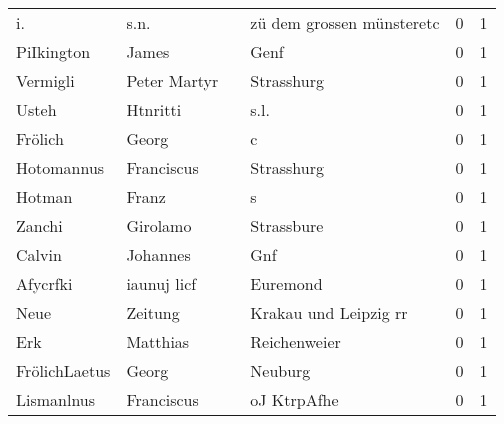 \documentclass[10pt,a4paper,landscape]{article}
\begin{document}
\begin{longtable}{llllrr}
                       i. &                               s.n. &             &                   zü dem grossen münsteretc &          0 &         1 \\
               PiIkington &                              James &             &                                        Genf &          0 &         1 \\
                 Vermigli &                       Peter Martyr &             &                                  Strasshurg &          0 &         1 \\
                    Usteh &                           Htnritti &             &                                        s.l. &          0 &         1 \\
                  Frölich &                              Georg &             &                                           c &          0 &         1 \\
               Hotomannus &                         Franciscus &             &                                  Strasshurg &          0 &         1 \\
                   Hotman &                              Franz &             &                                           s &          0 &         1 \\
                   Zanchi &                           Girolamo &             &                                  Strassbure &          0 &         1 \\
                   Calvin &                           Johannes &             &                                         Gnf &          0 &         1 \\
                 Afycrfki &                        iaunuj licf &             &                                    Euremond &          0 &         1 \\
                     Neue &                            Zeitung &             &                       Krakau und Leipzig rr &          0 &         1 \\
                      Erk &                           Matthias &             &                                Reichenweier &          0 &         1 \\
            FrölichLaetus &                              Georg &             &                                     Neuburg &          0 &         1 \\
               Lismanlnus &                         Franciscus &             &                                 oJ KtrpAfhe &          0 &         1 \\

\end{longtable}
\end{document}
